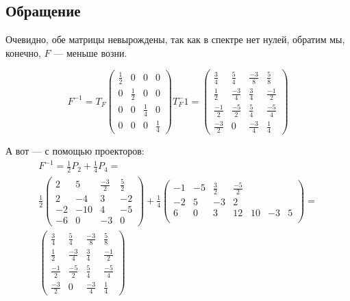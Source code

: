\documentclass[12pt, a4paper]{article}
\begin{document}
    \subsection{Обращение}


    Очевидно, обе матрицы невырождены, так как в спектре нет нулей, обратим мы, конечно, $F$ — меньше возни.

    \begin{equation}
        F^{-1} = T_F \left(\begin{matrix}
            \frac12 & 0 & 0 & 0 \\
            0 & \frac12 & 0 & 0 \\
            0 & 0 & \frac14 & 0 \\
            0 & 0 & 0 & \frac14
        \end{matrix}\right) T_F^-1 = \left(\begin{matrix}
            \frac{3}{4} & \frac{5}{4} & \frac{-3}{8} & \frac{5}{8} \\
            \frac{1}{2} & \frac{-3}{4} & \frac{3}{4} & \frac{-1}{2} \\
            \frac{-1}{2} & \frac{-5}{2} & \frac{5}{4} & \frac{-5}{4} \\
            \frac{-3}{2} & 0 & \frac{-3}{4} & \frac{1}{4}
        \end{matrix}\right)
    \end{equation}
 
    А вот — с помощью проекторов:
    \begin{multline}
        F^{-1} = \frac12 P_{2} + \frac14 P_4 = \\
        \frac12 \left(\begin{matrix}
            2 & 5 & \frac{-3}{2} & \frac{5}{2} \\
            2 & -4 & 3 & -2 \\
            -2 & -10 & 4 & -5 \\
            -6 & 0 & -3 & 0
        \end{matrix}\right) + \frac14 \left(\begin{matrix}
            -1 & -5 & \frac{3}{2} & \frac{-5}{2} \\
            -2 & 5 & -3 & 2 \\
            6 & 0 & 3 & 1
            2 & 10 & -3 & 5 \\
        \end{matrix}\right) = \\ 
        \left(\begin{matrix}
            \frac{3}{4} & \frac{5}{4} & \frac{-3}{8} & \frac{5}{8} \\
            \frac{1}{2} & \frac{-3}{4} & \frac{3}{4} & \frac{-1}{2} \\
            \frac{-1}{2} & \frac{-5}{2} & \frac{5}{4} & \frac{-5}{4} \\
            \frac{-3}{2} & 0 & \frac{-3}{4} & \frac{1}{4}
        \end{matrix}\right)
    \end{multline}
    
\end{document}
